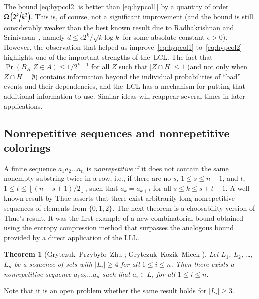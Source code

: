 \documentclass[10pt]{article}
\numberwithin{equation}{subsection}
\newtheorem{theo}{Theorem}[section]
\theoremstyle{definition}
\begin{document}
	The bound \eqref{eq:hypcol2} is better than \eqref{eq:hypcol1} by a quantity of order $\Omega\left(2^k\middle/k^2\right)$. This is, of course, not a significant improvement (and the bound is still considerably weaker than the best known result due to Radhakrishnan and Srinivasan~\cite{RS}, namely $d \leq \epsilon2^k /\sqrt{k\log k}$ for some absolute constant $\epsilon > 0$). However, the observation that helped us improve~\eqref{eq:hypcol1} to~\eqref{eq:hypcol2} highlights one of the important strengths of the~LCL. The fact that $\Pr(B_H \vert Z \in A) \leq 1/2^{k-1}$ for all $Z$ such that $|Z \cap H| \leq 1$ (and not only when $Z \cap H = \emptyset$) contains information beyond the individual probabilities of ``bad'' events and their dependencies, and the~LCL has a mechanism for putting that additional information to use. Similar ideas will reappear several times in later applications.	
	
	\subsection{Nonrepetitive sequences and nonrepetitive colorings}\label{subsec:nonrep}
	
	A finite sequence $a_1a_2 \ldots a_n$ is \emph{nonrepetitive} if it does not contain the same nonempty substring twice in a row, i.e., if there are no $s$, $1 \leq s \leq n-1$, and $t$, $1 \leq t \leq \left\lfloor (n-s+1)/2\right\rfloor$, such that $a_k = a_{k+t}$ for all $s \leq k \leq s+t-1$. A well-known result by Thue \cite{Thue} asserts that there exist arbitrarily long nonrepetitive sequences of elements from $\{0, 1, 2\}$. The next theorem is a choosability version of Thue's result. It was the first example of a new combinatorial bound obtained using the entropy compression method that surpasses the analogous bound provided by a direct application of the LLL.
	
	\begin{theo}[Grytczuk--Przyby\l{}o--Zhu \cite{GPZ}; Grytczuk--Kozik--Micek \cite{Grytczuk}]\label{theo:nonrepseq}
		Let $L_1$, $L_2$, \ldots, $L_n$ be a sequence of sets with $|L_i| \geq 4$ for all $1\leq i \leq n$. Then there exists a nonrepetitive sequence $a_1 a_2 \ldots a_n$ such that $a_i \in L_i$ for all $1 \leq i \leq n$.
	\end{theo}
	
	Note that it is an open problem whether the same result holds for $|L_i| \geq 3$.
	
\end{document}
